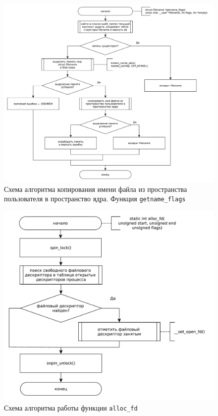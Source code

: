 \begin{figure}[h!btp]
	\centering
	\includegraphics[width=490pt]{inc/getname_flags.pdf}
	\caption{Схема алгоритма копирования имени файла из пространства пользователя в пространство ядра. Функция \texttt{getname\_flags}}
\end{figure}

\clearpage

\begin{figure}[h!btp]
	\centering
	\includegraphics[width=490pt]{inc/alloc_fd.pdf}
	\caption{Схема алгоритма работы функции \texttt{alloc\_fd}}
\end{figure}

